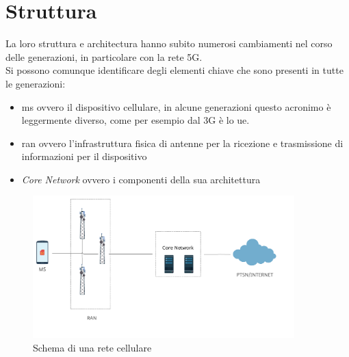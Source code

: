 \section{Struttura}
La loro struttura e architectura hanno subito numerosi cambiamenti nel corso delle generazioni, in particolare con la rete
5G.\\
Si possono comunque identificare degli elementi chiave che sono presenti in tutte le generazioni:
\begin{itemize}
    \item \gls{ms} ovvero il dispositivo cellulare, in alcune generazioni questo acronimo è leggermente diverso, come per esempio dal 3G è
    lo \gls{ue}.
    \item \gls{ran} ovvero l'infrastruttura fisica di antenne per la ricezione e trasmissione di informazioni per il dispositivo
    \item \textit{Core Network} ovvero i componenti della sua architettura
\end{itemize}
\begin{figure}[h]
    \centering
    \includegraphics[width=0.9\textwidth]{images/cellular-network-basic-scheme.png}
    \caption{Schema di una rete cellulare}
\end{figure}

\clearpage


